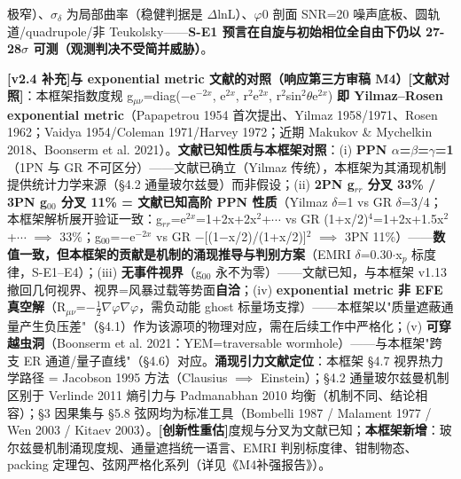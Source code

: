 \documentclass[UTF8,fontset=windows]{csoarticle}
\newcommand{\mtag}[1]{\textbf{[#1]}}
\newcommand{\up}[1]{\ensuremath{^{#1}}}
\newcommand{\down}[1]{\ensuremath{_{#1}}}
\begin{document}
极窄）、\ensuremath{\sigma}\down{\delta{}} 为局部曲率（稳健判据是 \ensuremath{\Delta}lnL）、\ensuremath{\varphi}0 剖面 SNR=20 噪声底板、圆轨道/quadrupole/非 Teukolsky------\textbf{S-E1 预言在自旋与初始相位全自由下仍以 27-28\ensuremath{\sigma} 可测（观测判决不受简并威胁）}。

\textbf{\mtag{v2.4 补充}与 exponential metric 文献的对照（响应第三方审稿 M4）}\mtag{文献对照}：本框架指数度规 g\down{\mu{}\nu{}}=diag(\ensuremath{-}e\up{-2x}, e\up{2x}, r\up{2}e\up{2x}, r\up{2}sin\up{2}\ensuremath{\theta}e\up{2x}) \textbf{即 Yilmaz--Rosen exponential metric}（Papapetrou 1954 首次提出、Yilmaz 1958/1971、Rosen 1962；Vaidya 1954/Coleman 1971/Harvey 1972；近期 Makukov \& Mychelkin 2018、Boonserm et al. 2021）。\textbf{文献已知性质与本框架对照}：(i) \textbf{PPN \ensuremath{\alpha}=\ensuremath{\beta}=\ensuremath{\gamma}=1}（1PN 与 GR 不可区分）------文献已确立（Yilmaz 传统），本框架为其涌现机制提供统计力学来源（\S{}4.2 通量玻尔兹曼）而非假设；(ii) \textbf{2PN g\down{rr} 分叉 33\% / 3PN g\down{00} 分叉 11\% = 文献已知高阶 PPN 性质}（Yilmaz \ensuremath{\delta}=1 vs GR \ensuremath{\delta}=3/4；本框架解析展开验证一致：g\down{rr}=e\up{2x}=1+2x+2x\up{2}+\ensuremath{\cdots} vs GR (1+x/2)\up{4}=1+2x+1.5x\up{2}+\ensuremath{\cdots} \ensuremath{\implies} 33\%；g\down{00}=\ensuremath{-}e\up{-2x} vs GR \ensuremath{-}[(1\ensuremath{-}x/2)/(1+x/2)]\up{2} \ensuremath{\implies} 3PN 11\%）------\textbf{数值一致，但本框架的贡献是机制的涌现推导与判别方案}（EMRI \ensuremath{\delta}=0.30\ensuremath{\cdot}x\down{p} 标度律，S-E1--E4）；(iii) \textbf{无事件视界}（g\down{00} 永不为零）------文献已知，与本框架 v1.13 撤回几何视界、视界=风暴过载等势面\textbf{自洽}；(iv) \textbf{exponential metric 非 EFE 真空解}（R\down{\mu{}\nu{}}=\ensuremath{-}\ensuremath{\tfrac12}\ensuremath{\nabla}\ensuremath{\varphi}\ensuremath{\nabla}\ensuremath{\varphi}，需负动能 ghost 标量场支撑）------本框架以"质量遮蔽通量产生负压差"（\S{}4.1）作为该源项的物理对应，需在后续工作中严格化；(v) \textbf{可穿越虫洞}（Boonserm et al. 2021：YEM=traversable wormhole）------与本框架"跨支 ER 通道/量子直线"（\S{}4.6）对应。\textbf{涌现引力文献定位}：本框架 \S{}4.7 视界热力学路径 = Jacobson 1995 方法（Clausius \ensuremath{\implies} Einstein）；\S{}4.2 通量玻尔兹曼机制区别于 Verlinde 2011 熵引力与 Padmanabhan 2010 均衡（机制不同、结论相容）；\S{}3 因果集与 \S{}5.8 弦网均为标准工具（Bombelli 1987 / Malament 1977 / Wen 2003 / Kitaev 2003）。\mtag{创新性重估}度规与分叉为文献已知；\textbf{本框架新增}：玻尔兹曼机制涌现度规、通量遮挡统一语言、EMRI 判别标度律、钳制物态、packing 定理包、弦网严格化系列（详见《M4补强报告》）。
\end{document}
